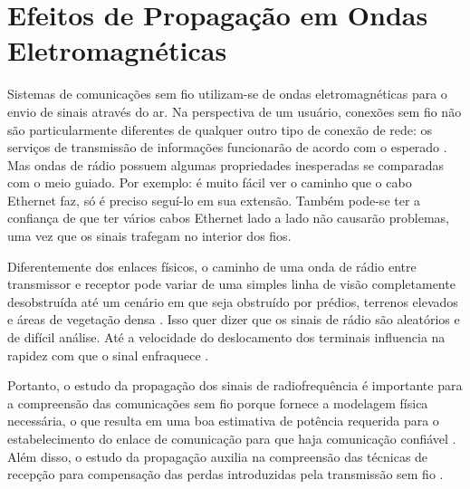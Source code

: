 \begin{figure}[H]
	\centering
\end{figure}

\section{Efeitos de Propagação em Ondas Eletromagnéticas}
\label{sec:efeitos-propagacao-OE}

Sistemas de comunicações sem fio utilizam-se de ondas eletromagnéticas para o envio de sinais através do ar. Na perspectiva de um usuário, conexões sem fio não são particularmente diferentes de qualquer outro tipo de conexão de rede: os serviços de transmissão de informações funcionarão de acordo com o esperado \cite{flickenger2008}. Mas ondas de rádio possuem algumas propriedades inesperadas se comparadas com o meio guiado.  Por exemplo: é muito fácil ver o caminho que o cabo Ethernet faz, só é preciso seguí-lo em sua extensão. Também pode-se ter a confiança de que ter vários cabos Ethernet lado a lado não causarão problemas, uma vez que os sinais trafegam no interior dos fios.

Diferentemente dos enlaces físicos, o caminho de uma onda de rádio entre transmissor e receptor pode variar de uma simples linha de visão completamente desobstruída até um cenário em que seja obstruído por prédios, terrenos elevados e áreas de vegetação densa \cite{rappaport2009}. Isso quer dizer que os sinais de rádio são aleatórios e de difícil análise. Até a velocidade do deslocamento dos terminais influencia na rapidez com que o sinal enfraquece \cite{rappaport2009}.

Portanto, o estudo da propagação dos sinais de radiofrequência é importante para a compreensão das comunicações sem fio porque fornece a modelagem física necessária, o que resulta em uma boa estimativa de potência requerida para o estabelecimento do enlace de comunicação para que haja comunicação confiável \cite{haykin2008}. Além disso, o estudo da propagação auxilia na compreensão das técnicas de recepção para compensação das perdas introduzidas pela transmissão sem fio \cite{haykin2008}.

